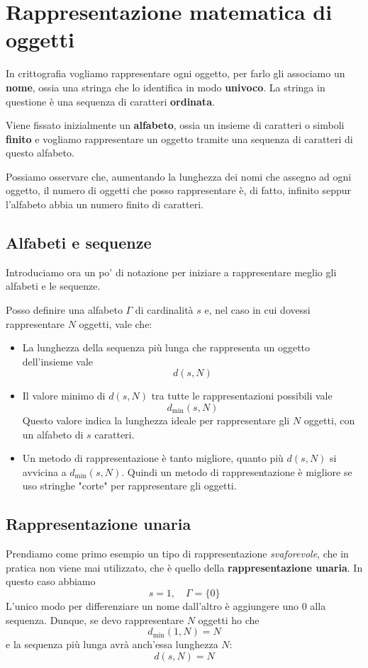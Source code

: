 \chapter{Rappresentazione matematica di oggetti}\label{rappresentazione}
In crittografia vogliamo rappresentare ogni oggetto, per farlo gli associamo un \textbf{nome}, ossia una stringa che lo
identifica in modo \textbf{univoco}. La stringa in questione \`e una sequenza di caratteri \textbf{ordinata}.

Viene fissato inizialmente un \textbf{alfabeto}, ossia un insieme di caratteri o simboli \textbf{finito} e vogliamo
rappresentare un oggetto tramite una sequenza di caratteri di questo alfabeto.

Possiamo osservare che, aumentando la lunghezza dei nomi che assegno ad ogni oggetto, il numero di oggetti che posso
rappresentare \`e, di fatto, infinito seppur l'alfabeto abbia un numero finito di caratteri.

\section{Alfabeti e sequenze}\label{alfabeti}
Introduciamo ora un po' di notazione per iniziare a rappresentare meglio gli alfabeti e le sequenze.

Posso definire una alfabeto $\Gamma$ di cardinalit\`a $s$ e, nel caso in cui dovessi rappresentare $N$ oggetti, vale che:
\begin{itemize}
	\item La lunghezza della sequenza pi\`u lunga che rappresenta un oggetto dell'insieme vale
	      \[ d(s, N) \]
	\item Il valore minimo di $d(s, N)$ tra tutte le rappresentazioni possibili vale
	      \[ d_{\min}(s, N) \]
	      Questo valore indica la lunghezza ideale per rappresentare gli $N$ oggetti, con un alfabeto di $s$ caratteri.
	\item Un metodo di rappresentazione \`e tanto migliore, quanto pi\`u $d(s, N)$ si avvicina a $d_{\min}(s, N)$. Quindi
	      un metodo di rappresentazione \`e migliore se uso stringhe "corte" per rappresentare gli oggetti.
\end{itemize}

\section{Rappresentazione unaria}\label{rappresentazione_unaria}
Prendiamo come primo esempio un tipo di rappresentazione \emph{svaforevole}, che in pratica non viene mai utilizzato, che
\`e quello della \textbf{rappresentazione unaria}. In questo caso abbiamo
\[ s = 1, \quad \Gamma = \{ 0 \} \]
L'unico modo per differenziare un nome dall'altro \`e aggiungere uno $0$ alla sequenza. Dunque, se devo rappresentare $N$
oggetti ho che
\[ d_{\min}(1, N) = N \]
e la sequenza pi\`u lunga avr\`a anch'essa lunghezza $N$:
\[ d(s, N) = N \]


